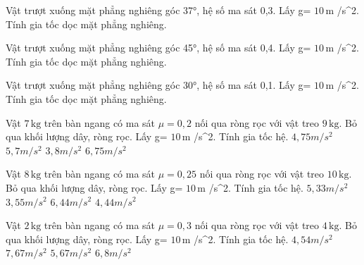 \begin{bt}
Vật trượt xuống mặt phẳng nghiêng góc 37°, hệ số ma sát 0,3. Lấy g= $10\,\text{m}$ /s^2. Tính gia tốc dọc mặt phẳng nghiêng.
\end{bt}

\begin{bt}
Vật trượt xuống mặt phẳng nghiêng góc 45°, hệ số ma sát 0,4. Lấy g= $10\,\text{m}$ /s^2. Tính gia tốc dọc mặt phẳng nghiêng.
\end{bt}

\begin{bt}
Vật trượt xuống mặt phẳng nghiêng góc 30°, hệ số ma sát 0,1. Lấy g= $10\,\text{m}$ /s^2. Tính gia tốc dọc mặt phẳng nghiêng.
\end{bt}

\begin{ex}
Vật $7\,\text{kg}$ trên bàn ngang có ma sát $\mu=0,2$ nối qua ròng rọc với vật treo $9\,\text{kg}$. Bỏ qua khối lượng dây, ròng rọc. Lấy g= $10\,\text{m}$ /s^2. Tính gia tốc hệ.
\choice
{\True $4,75 m/s^2$}
{$5,7 m/s^2$}
{$3,8 m/s^2$}
{$6,75 m/s^2$}
\end{ex}

\begin{ex}
Vật $8\,\text{kg}$ trên bàn ngang có ma sát $\mu=0,25$ nối qua ròng rọc với vật treo $10\,\text{kg}$. Bỏ qua khối lượng dây, ròng rọc. Lấy g= $10\,\text{m}$ /s^2. Tính gia tốc hệ.
\choice
{$5,33 m/s^2$}
{$3,55 m/s^2$}
{$6,44 m/s^2$}
{\True $4,44 m/s^2$}
\end{ex}

\begin{ex}
Vật $2\,\text{kg}$ trên bàn ngang có ma sát $\mu=0,3$ nối qua ròng rọc với vật treo $4\,\text{kg}$. Bỏ qua khối lượng dây, ròng rọc. Lấy g= $10\,\text{m}$ /s^2. Tính gia tốc hệ.
\choice
{$4,54 m/s^2$}
{$7,67 m/s^2$}
{\True $5,67 m/s^2$}
{$6,8 m/s^2$}
\end{ex}

